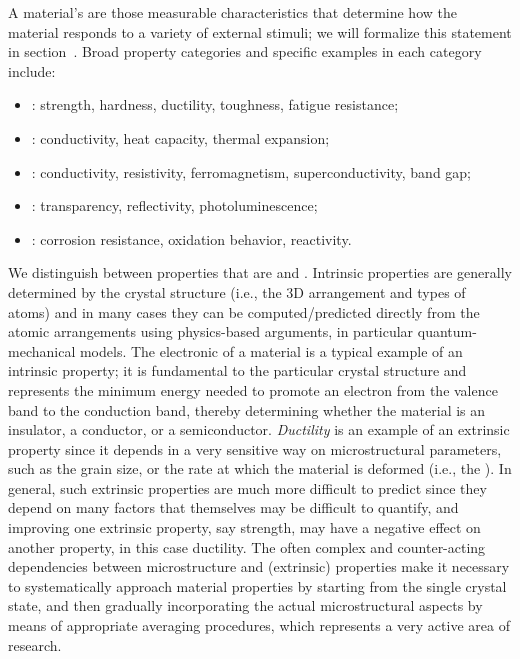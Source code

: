 A material's  are those measurable characteristics that determine how the material responds to a variety of external stimuli; we will formalize this statement in section~. Broad property categories and specific examples in each category include:
\begin{itemize}
\item {}: strength, hardness, ductility, toughness, fatigue resistance;
\item {}: conductivity, heat capacity, thermal expansion;
\item {}: conductivity, resistivity, ferromagnetism, superconductivity, band gap;
\item {}: transparency, reflectivity, photoluminescence;
\item {}: corrosion resistance, oxidation behavior, reactivity.
\end{itemize}

We distinguish between properties that are  and . Intrinsic properties are generally determined by the crystal structure (i.e., the 3D arrangement and types of atoms) and in many cases they can be computed/predicted directly from the atomic arrangements using physics-based arguments, in particular quantum-mechanical models.  The electronic  of a material is  a typical example of an intrinsic property; it is fundamental to the particular crystal structure and represents the minimum energy needed to promote an electron from the valence band to the conduction band, thereby determining whether the material is an insulator, a conductor, or a semiconductor.  \textit{Ductility} is an example of an extrinsic property since it depends in a very sensitive way on microstructural parameters, such as the grain size, or the rate at which the material is deformed (i.e., the ).  In general, such extrinsic properties are much more difficult to predict since they depend on many factors that themselves may be difficult to quantify, and improving one extrinsic property, say strength, may have a negative effect on another property, in this case ductility.  The often complex and counter-acting dependencies between microstructure and (extrinsic) properties make it necessary to systematically approach material properties by starting from the single crystal state, and then gradually incorporating the actual microstructural aspects by means of appropriate averaging procedures, which represents a very active area of research.


